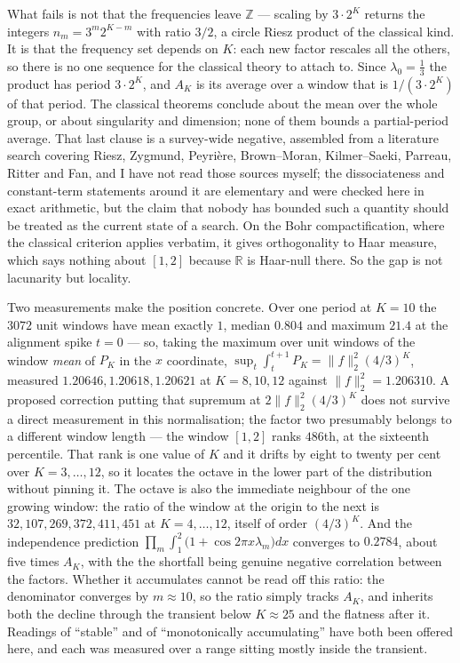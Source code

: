 \documentclass[11pt]{article}
\theoremstyle{remark}
\newcommand{\lam}{\lambda}
\begin{document}
What fails is not that the frequencies leave $\mathbb Z$ --- scaling by $3\cdot2^K$ returns the integers
$n_m=3^m2^{K-m}$ with ratio $3/2$, a circle Riesz product of the classical kind. It is that the frequency
set depends on $K$: each new factor rescales all the others, so there is no one sequence for the
classical theory to attach to. Since $\lam_0=\tfrac13$ the product has period
$3\cdot2^K$, and $A_K$ is its average over a window that is $1/(3\cdot2^K)$ of that period. The classical
theorems conclude about the mean over the whole group, or about singularity and dimension; none of them
bounds a partial-period average. That last clause is a survey-wide negative, assembled from a literature
search covering Riesz, Zygmund, Peyri\`ere, Brown--Moran, Kilmer--Saeki, Parreau, Ritter and Fan, and I
have not read those sources myself; the dissociateness and constant-term statements around it are
elementary and were checked here in exact arithmetic, but the claim that nobody has bounded such a
quantity should be treated as the current state of a search. On the Bohr compactification, where the classical criterion applies
verbatim, it gives orthogonality to Haar measure, which says nothing about $[1,2]$ because $\mathbb R$ is
Haar-null there. So the gap is not lacunarity but locality.

Two measurements make the position concrete. Over one period at $K=10$ the $3072$ unit windows have mean
exactly $1$, median $0.804$ and maximum $21.4$ at the alignment spike $t=0$ --- so, taking the maximum over unit
windows of the window \emph{mean} of $P_K$ in the $x$ coordinate, $\sup_t\int_t^{t+1}P_K=\|f\|_2^2(4/3)^K$,
measured $1.20646,1.20618,1.20621$ at $K=8,10,12$ against $\|f\|_2^2=1.206310$. A proposed correction
putting that supremum at $2\|f\|_2^2(4/3)^K$ does not survive a direct measurement in this
normalisation; the factor two presumably belongs to a different window length --- the window $[1,2]$ ranks
$486$th, at the sixteenth percentile. That rank is one value of $K$ and it drifts by eight to twenty per
cent over $K=3,\dots,12$, so it locates the octave in the lower part of the distribution without pinning
it. The octave is also the immediate neighbour of the one growing window: the ratio of the window at the
origin to the next is $32,107,269,372,411,451$ at $K=4,\dots,12$, itself of order $(4/3)^K$. And the independence prediction
$\prod_m\int_1^2\bigl(1+\cos2\pi x\lam_m\bigr)dx$ converges to $0.2784$, about five times $A_K$, with the
the shortfall being genuine negative correlation between the factors. Whether it accumulates cannot be
read off this ratio: the denominator converges by $m\approx10$, so the ratio simply tracks $A_K$, and
inherits both the decline through the transient below $K\approx25$ and the flatness after it. Readings
of ``stable'' and of ``monotonically accumulating'' have both been offered here, and each was measured
over a range sitting mostly inside the transient.
\end{document}
